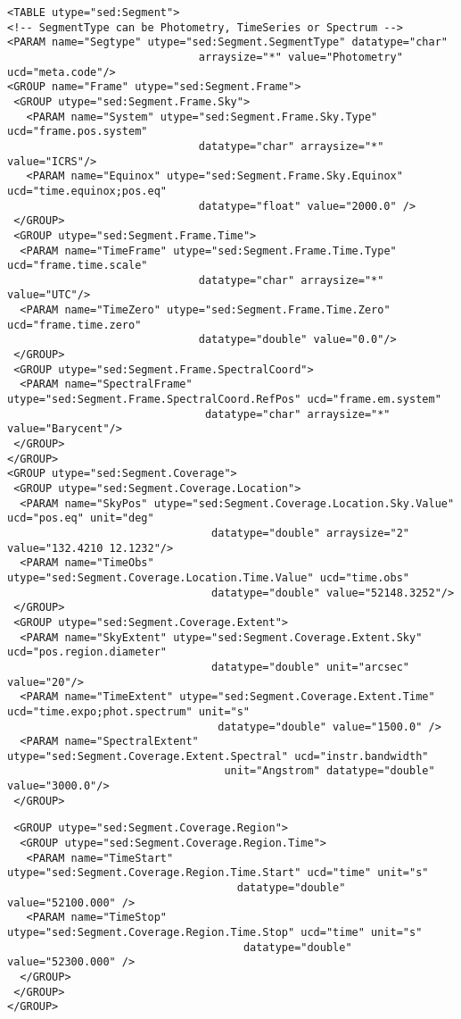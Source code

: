 \documentclass[11pt]{article}
\newenvironment{fmpage}
     {\begin{lrbox}{\fmbox}\begin{minipage}{6.5in}}
     {\end{minipage}\end{lrbox}\colorbox{iblue}{\fbox{\usebox{\fmbox}}}}
\begin{document}
{\begin{flushleft}
\begin{fmpage}
\begin{verbatim}
<TABLE utype="sed:Segment">   
<!-- SegmentType can be Photometry, TimeSeries or Spectrum -->
<PARAM name="Segtype" utype="sed:Segment.SegmentType" datatype="char" 
                              arraysize="*" value="Photometry" ucd="meta.code"/>
<GROUP name="Frame" utype="sed:Segment.Frame">
 <GROUP utype="sed:Segment.Frame.Sky">
   <PARAM name="System" utype="sed:Segment.Frame.Sky.Type" ucd="frame.pos.system" 
                              datatype="char" arraysize="*" value="ICRS"/>
   <PARAM name="Equinox" utype="sed:Segment.Frame.Sky.Equinox" ucd="time.equinox;pos.eq"
                              datatype="float" value="2000.0" />
 </GROUP>
 <GROUP utype="sed:Segment.Frame.Time">
  <PARAM name="TimeFrame" utype="sed:Segment.Frame.Time.Type" ucd="frame.time.scale" 
                              datatype="char" arraysize="*" value="UTC"/>
  <PARAM name="TimeZero" utype="sed:Segment.Frame.Time.Zero" ucd="frame.time.zero" 
                              datatype="double" value="0.0"/>
 </GROUP>
 <GROUP utype="sed:Segment.Frame.SpectralCoord">
  <PARAM name="SpectralFrame" utype="sed:Segment.Frame.SpectralCoord.RefPos" ucd="frame.em.system" 
                               datatype="char" arraysize="*" value="Barycent"/>
 </GROUP>
</GROUP>
<GROUP utype="sed:Segment.Coverage">
 <GROUP utype="sed:Segment.Coverage.Location">
  <PARAM name="SkyPos" utype="sed:Segment.Coverage.Location.Sky.Value" ucd="pos.eq" unit="deg" 
                                datatype="double" arraysize="2" value="132.4210 12.1232"/>
  <PARAM name="TimeObs" utype="sed:Segment.Coverage.Location.Time.Value" ucd="time.obs" 
                                datatype="double" value="52148.3252"/>
 </GROUP>
 <GROUP utype="sed:Segment.Coverage.Extent">
  <PARAM name="SkyExtent" utype="sed:Segment.Coverage.Extent.Sky" ucd="pos.region.diameter" 
                                datatype="double" unit="arcsec" value="20"/>
  <PARAM name="TimeExtent" utype="sed:Segment.Coverage.Extent.Time" ucd="time.expo;phot.spectrum" unit="s" 
                                 datatype="double" value="1500.0" />
  <PARAM name="SpectralExtent" utype="sed:Segment.Coverage.Extent.Spectral" ucd="instr.bandwidth"
                                  unit="Angstrom" datatype="double" value="3000.0"/>
 </GROUP>

\end{verbatim}

\end{fmpage}
\begin{fmpage}

\begin{verbatim}
 <GROUP utype="sed:Segment.Coverage.Region">
  <GROUP utype="sed:Segment.Coverage.Region.Time">
   <PARAM name="TimeStart" utype="sed:Segment.Coverage.Region.Time.Start" ucd="time" unit="s" 
                                    datatype="double" value="52100.000" />
   <PARAM name="TimeStop" utype="sed:Segment.Coverage.Region.Time.Stop" ucd="time" unit="s" 
                                     datatype="double" value="52300.000" />
  </GROUP>
 </GROUP>
</GROUP>


\end{verbatim}
\end{fmpage}
\end{flushleft}}
\end{document}

